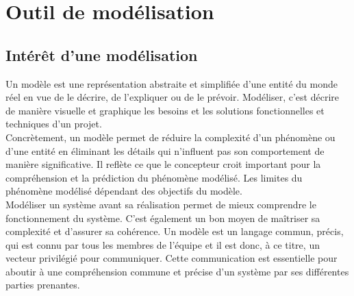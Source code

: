 \section{Outil de modélisation}
\subsection{Intérêt d'une modélisation}
Un modèle est une représentation abstraite et simplifiée d'une entité du monde réel en vue de le décrire, de l'expliquer ou de le prévoir. Modéliser, c’est décrire de manière visuelle et graphique les besoins et les solutions fonctionnelles et techniques d'un projet.\\
Concrètement, un modèle permet de réduire la complexité d'un phénomène ou d'une entité en éliminant les détails qui n'influent pas son comportement de manière significative. Il reflète ce que le concepteur croit important pour la compréhension et la prédiction du phénomène modélisé. Les limites du phénomène modélisé dépendant des objectifs du modèle.\\
Modéliser un système avant sa réalisation permet de mieux comprendre le fonctionnement du système. C’est également un bon moyen de maîtriser sa complexité et d’assurer sa cohérence. Un modèle est un langage commun, précis, qui est connu par tous les membres de l’équipe et il est donc, à ce titre, un vecteur privilégié pour communiquer. Cette communication est essentielle pour aboutir à une compréhension commune  et précise d'un système par ses différentes parties prenantes.
